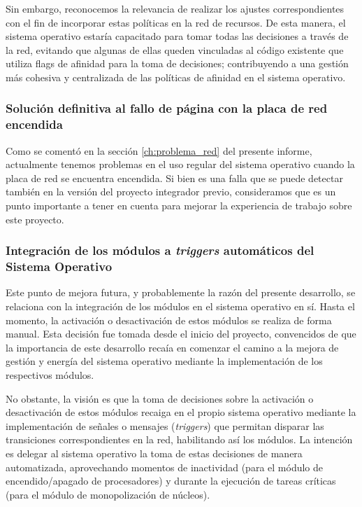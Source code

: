 Sin embargo, reconocemos la relevancia de realizar los ajustes correspondientes con el fin de incorporar estas políticas en la red de recursos. De esta manera, el sistema operativo estaría capacitado para tomar todas las decisiones a través de la red, evitando que algunas de ellas queden vinculadas al código existente que utiliza flags de afinidad para la toma de decisiones; contribuyendo a una gestión más cohesiva y centralizada de las políticas de afinidad en el sistema operativo.\par

\subsubsection{Solución definitiva al fallo de página con la placa de red encendida}
Como se comentó en la sección \ref{ch:problema_red} del presente informe, actualmente tenemos problemas en el uso regular del sistema operativo cuando la placa de red se encuentra encendida. Si bien es una falla que se puede detectar también en la versión del proyecto integrador previo, consideramos que es un punto importante a tener en cuenta para mejorar la experiencia de trabajo sobre este proyecto.\par

\subsubsection{Integración de los módulos a \textit{triggers} automáticos del Sistema Operativo}
Este punto de mejora futura, y probablemente la razón del presente desarrollo, se relaciona con la integración de los módulos en el sistema operativo en sí. Hasta el momento, la activación o desactivación de estos módulos se realiza de forma manual. Esta decisión fue tomada desde el inicio del proyecto, convencidos de que la importancia de este desarrollo recaía en comenzar el camino a la mejora de gestión y energía del sistema operativo mediante la implementación de los respectivos módulos.\par

No obstante, la visión es que la toma de decisiones sobre la activación o desactivación de estos módulos recaiga en el propio sistema operativo mediante la implementación de señales o mensajes (\textit{triggers}) que permitan disparar las transiciones correspondientes en la red, habilitando así los módulos. La intención es delegar al sistema operativo la toma de estas decisiones de manera automatizada, aprovechando momentos de inactividad (para el módulo de encendido/apagado de procesadores) y durante la ejecución de tareas críticas (para el módulo de monopolización de núcleos).\par
